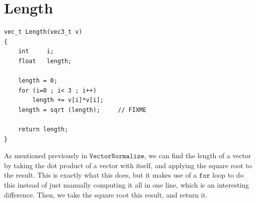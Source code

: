 \documentclass{article}
\begin{document}
\section{Length}
\begin{verbatim}
vec_t Length(vec3_t v)
{
	int		i;
	float	length;
	
	length = 0;
	for (i=0 ; i< 3 ; i++)
		length += v[i]*v[i];
	length = sqrt (length);		// FIXME

	return length;
}
\end{verbatim}
As mentioned previously in $\texttt{VectorNormalize}$, we can find the length of a vector by taking the dot product of a vector with itself, and applying the square root to the result. This is exactly what this does, but it makes use of a $\texttt{for}$ loop to do this instead of just manually computing it all in one line, which is an interesting difference.  Then, we take the square root this result, and return it.
\end{document}
